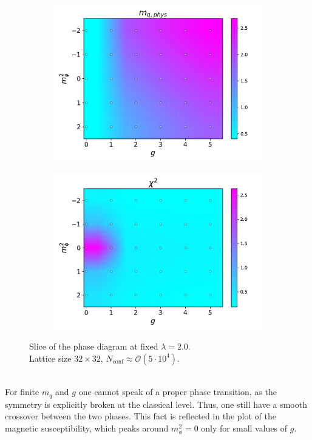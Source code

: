 \begin{figure}[htp]
\begin{subfigure}[b]{0.48\textwidth}
        \includegraphics[width=\textwidth]{figures/phase_diagram/m_g_mq.pdf}
    \end{subfigure}
    \begin{subfigure}[b]{0.48\textwidth}
        \includegraphics[width=\textwidth]{figures/phase_diagram/m_g_chi2.pdf}
    \end{subfigure}
    \caption{Slice of the phase diagram at fixed $\lambda = 2.0$. \\ Lattice size $32 \times 32$, $N_\text{conf} \approx \mathcal{O}(5 \cdot 10^4)$.}
    \label{fig:phase_diagram_g_m}
\end{figure}\\
For finite $m_q$ and $g$ one cannot speak of a proper phase transition, as the symmetry is explicitly broken at the classical level. Thus, one still have a smooth crossover between the two phases. This fact is reflected in the plot of the magnetic susceptibility, which peaks around $m_\phi^2 = 0$ only for small values of $g$. \\
